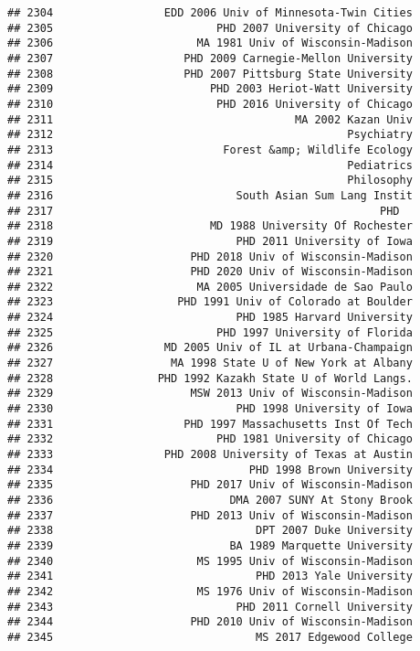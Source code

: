 \documentclass[
]{article}
\begin{document}
\begin{verbatim}
## 2304                 EDD 2006 Univ of Minnesota-Twin Cities
## 2305                         PHD 2007 University of Chicago
## 2306                      MA 1981 Univ of Wisconsin-Madison
## 2307                    PHD 2009 Carnegie-Mellon University
## 2308                    PHD 2007 Pittsburg State University
## 2309                        PHD 2003 Heriot-Watt University
## 2310                         PHD 2016 University of Chicago
## 2311                                     MA 2002 Kazan Univ
## 2312                                             Psychiatry
## 2313                          Forest &amp; Wildlife Ecology
## 2314                                             Pediatrics
## 2315                                             Philosophy
## 2316                            South Asian Sum Lang Instit
## 2317                                                  PHD  
## 2318                        MD 1988 University Of Rochester
## 2319                            PHD 2011 University of Iowa
## 2320                     PHD 2018 Univ of Wisconsin-Madison
## 2321                     PHD 2020 Univ of Wisconsin-Madison
## 2322                      MA 2005 Universidade de Sao Paulo
## 2323                   PHD 1991 Univ of Colorado at Boulder
## 2324                            PHD 1985 Harvard University
## 2325                         PHD 1997 University of Florida
## 2326                 MD 2005 Univ of IL at Urbana-Champaign
## 2327                  MA 1998 State U of New York at Albany
## 2328                PHD 1992 Kazakh State U of World Langs.
## 2329                     MSW 2013 Univ of Wisconsin-Madison
## 2330                            PHD 1998 University of Iowa
## 2331                    PHD 1997 Massachusetts Inst Of Tech
## 2332                         PHD 1981 University of Chicago
## 2333                 PHD 2008 University of Texas at Austin
## 2334                              PHD 1998 Brown University
## 2335                     PHD 2017 Univ of Wisconsin-Madison
## 2336                           DMA 2007 SUNY At Stony Brook
## 2337                     PHD 2013 Univ of Wisconsin-Madison
## 2338                               DPT 2007 Duke University
## 2339                           BA 1989 Marquette University
## 2340                      MS 1995 Univ of Wisconsin-Madison
## 2341                               PHD 2013 Yale University
## 2342                      MS 1976 Univ of Wisconsin-Madison
## 2343                            PHD 2011 Cornell University
## 2344                     PHD 2010 Univ of Wisconsin-Madison
## 2345                               MS 2017 Edgewood College

\end{verbatim}
\end{document}
